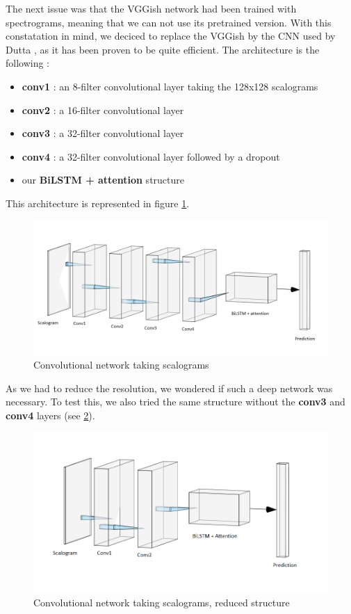 \documentclass[final]{cvpr}
\begin{document}
The next issue was that the VGGish network had been trained with spectrograms, meaning that we can not use its pretrained version. With this constatation in mind, we deciced to replace the VGGish by the CNN used by Dutta \etal, as it has been proven to be quite efficient. The architecture is the following :
\begin{itemize}
	\item \textbf{conv1} : an 8-filter convolutional layer taking the 128x128 scalograms
	\item \textbf{conv2} : a 16-filter convolutional layer
	\item \textbf{conv3} : a 32-filter convolutional layer
	\item \textbf{conv4} : a 32-filter convolutional layer followed by a dropout
	\item our \textbf{BiLSTM + attention} structure
\end{itemize}
This architecture is represented in figure \ref{cnn}.
\begin{figure}
	\centering
	\includegraphics[scale = 0.65]{cnn.png}
	\caption{Convolutional network taking scalograms}
	\label{cnn}
\end{figure}
As we had to reduce the resolution, we wondered if such a deep network was necessary. To test this, we also tried the same structure without the \textbf{conv3} and \textbf{conv4} layers (see \ref{reduit}).
\begin{figure}
	\centering
	\includegraphics[scale = 0.45]{cnnreduit.png}
	\caption{Convolutional network taking scalograms, reduced structure}
	\label{reduit}
\end{figure}
\end{document}
